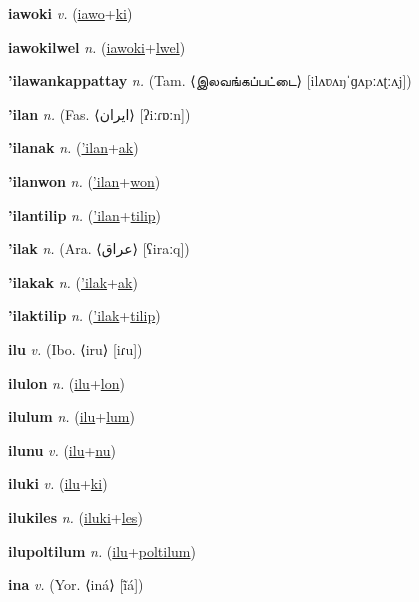 \textbf{\hypertarget{iawoki}{iawoki}} \textit{v.} (\hyperlink{iawo}{iawo}+\allowbreak \hyperlink{ki}{ki})


\textbf{\hypertarget{iawokilwel}{iawokilwel}} \textit{n.} (\hyperlink{iawoki}{iawoki}+\allowbreak \hyperlink{lwel}{lwel})


\textbf{\hypertarget{'ilawankappattay}{'ilawankappattay}} \textit{n.} (Tam. ⟨{\tamil{}இலவங்கப்பட்டை}⟩ [ilʌʋʌŋˈɡʌpːʌʈːʌj])


\textbf{\hypertarget{'ilan}{'ilan}} \textit{n.} (Fas. ⟨{\arabics{}ایران‎}⟩ [ʔiːɾɒːn])


\textbf{\hypertarget{'ilanak}{'ilanak}} \textit{n.} (\hyperlink{'ilan}{'ilan}+\allowbreak \hyperlink{ak}{ak})


\textbf{\hypertarget{'ilanwon}{'ilanwon}} \textit{n.} (\hyperlink{'ilan}{'ilan}+\allowbreak \hyperlink{won}{won})


\textbf{\hypertarget{'ilantilip}{'ilantilip}} \textit{n.} (\hyperlink{'ilan}{'ilan}+\allowbreak \hyperlink{tilip}{tilip})


\textbf{\hypertarget{'ilak}{'ilak}} \textit{n.} (Ara. ⟨{\arabics{}عراق}⟩ [ʕiraːq])


\textbf{\hypertarget{'ilakak}{'ilakak}} \textit{n.} (\hyperlink{'ilak}{'ilak}+\allowbreak \hyperlink{ak}{ak})


\textbf{\hypertarget{'ilaktilip}{'ilaktilip}} \textit{n.} (\hyperlink{'ilak}{'ilak}+\allowbreak \hyperlink{tilip}{tilip})


\textbf{\hypertarget{ilu}{ilu}} \textit{v.} (Ibo. ⟨iru⟩ [iɾu])


\textbf{\hypertarget{ilulon}{ilulon}} \textit{n.} (\hyperlink{ilu}{ilu}+\allowbreak \hyperlink{lon}{lon})


\textbf{\hypertarget{ilulum}{ilulum}} \textit{n.} (\hyperlink{ilu}{ilu}+\allowbreak \hyperlink{lum}{lum})


\textbf{\hypertarget{ilunu}{ilunu}} \textit{v.} (\hyperlink{ilu}{ilu}+\allowbreak \hyperlink{nu}{nu})


\textbf{\hypertarget{iluki}{iluki}} \textit{v.} (\hyperlink{ilu}{ilu}+\allowbreak \hyperlink{ki}{ki})


\textbf{\hypertarget{ilukiles}{ilukiles}} \textit{n.} (\hyperlink{iluki}{iluki}+\allowbreak \hyperlink{les}{les})


\textbf{\hypertarget{ilupoltilum}{ilupoltilum}} \textit{n.} (\hyperlink{ilu}{ilu}+\allowbreak \hyperlink{poltilum}{poltilum})


\textbf{\hypertarget{ina}{ina}} \textit{v.} (Yor. ⟨iná⟩ [ĩ̄á])


